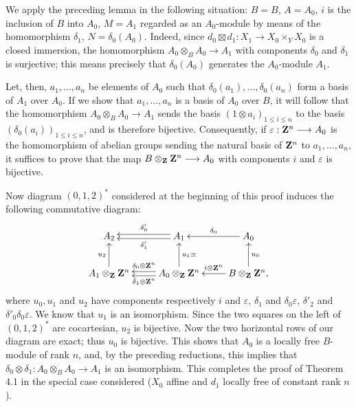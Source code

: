 We apply the preceding lemma in the following situation: $B=B$, $A=A_0$, $i$ is the inclusion of $B$ into $A_0$, $M=A_1$ regarded as an $A_0$-module by means of the homomorphism $\delta_1$, $N=\delta_0(A_0)$. Indeed, since $d_0\boxtimes d_1:X_1\to X_0\times_YX_0$ is a closed immersion, the homomorphism $A_0\otimes_BA_0\to A_1$ with components $\delta_0$ and $\delta_1$ is surjective; this means precisely that $\delta_0(A_0)$ generates the $A_0$-module $A_1$.

Let, then, $a_1,\ldots,a_n$ be elements of $A_0$ such that $\delta_0(a_1),\ldots,\delta_0(a_n)$ form a basis of $A_1$ over $A_0$. If we show that $a_1,\ldots,a_n$ is a basis of $A_0$ over $B$, it will follow that the homomorphism $A_0\otimes_BA_0\to A_1$ sends the basis $(1\otimes a_i)_{1\leq i\leq n}$ to the basis $(\delta_0(a_i))_{1\leq i\leq n}$, and is therefore bijective. Consequently, if $\varepsilon:\mathbf{Z}^n\longrightarrow A_0$ is the homomorphism of abelian groups sending the natural basis of $\mathbf{Z}^n$ to $a_1,\ldots,a_n$, it suffices to prove that the map $B\otimes_{\mathbf{Z}}\mathbf{Z}^n\longrightarrow A_0$ with components $i$ and $\varepsilon$ is bijective.

Now diagram $(0,1,2)^*$ considered at the beginning of this proof induces the following commutative diagram:
\[
\xymatrix{A_2&A_1\ar@<.5ex>[l]^{\delta'_1}\ar@<-.5ex>[l]_{\delta'_0}&A_0\ar[l]_{\delta_0}\\A_1\otimes_{\ZZ}\ZZ^n\ar[u]^{u_2}&A_0\otimes_{\ZZ}\ZZ^n\ar@<.5ex>[l]^{\delta_1\otimes\ZZ^n}\ar@<-.5ex>[l]_{\delta_0\otimes\ZZ^n}\ar[u]_{u_1\simeq}&B\otimes_{\ZZ}\ZZ^n\ar[l]_{i\otimes\ZZ^n}\ar[u]_{u_0},}
\]
where $u_0,u_1$ and $u_2$ have components respectively $i$ and $\varepsilon$, $\delta_1$ and $\delta_0\varepsilon$, $\delta'_2$ and $\delta'_0\delta_0\varepsilon$. We know that $u_1$ is an isomorphism. Since the two squares on the left of $(0,1,2)^*$ are cocartesian, $u_2$ is bijective. Now the two horizontal rows of our diagram are exact; thus $u_0$ is bijective. This shows that $A_0$ is a locally free $B$-module of rank $n$, and, by the preceding reductions, this implies that $\delta_0\otimes\delta_1:A_0\otimes_BA_0\to A_1$ is an isomorphism. This completes the proof of Theorem 4.1 in the special case considered ($X_0$ affine and $d_1$ locally free of constant rank $n$).

